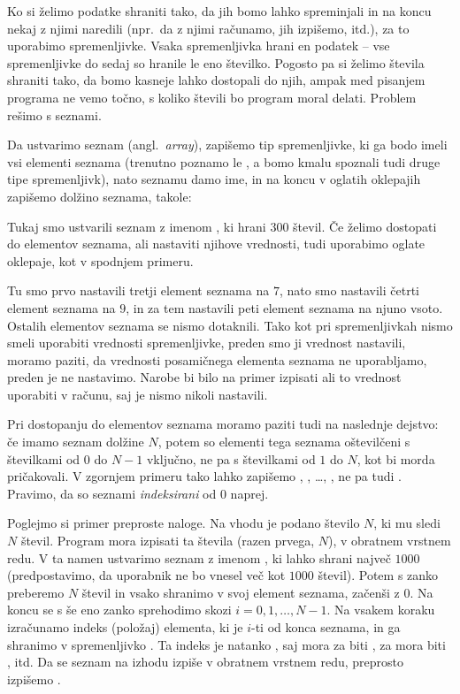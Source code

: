 
Ko si želimo podatke shraniti tako, da jih bomo lahko spreminjali in na koncu
nekaj z njimi naredili (npr.~da z njimi računamo, jih izpišemo, itd.), za to
uporabimo spremenljivke.
Vsaka spremenljivka hrani en podatek -- vse spremenljivke do sedaj so hranile le
eno številko.
Pogosto pa si želimo števila shraniti tako, da bomo kasneje lahko dostopali do
njih, ampak med pisanjem programa ne vemo točno, s koliko števili bo program
moral delati.
Problem rešimo s seznami.

Da ustvarimo seznam (angl.~\emph{array}), zapišemo tip spremenljivke, ki ga bodo
imeli vsi elementi seznama (trenutno poznamo le , a bomo kmalu
spoznali tudi druge tipe spremenljivk), nato seznamu damo ime, in na koncu v
oglatih oklepajih zapišemo dolžino seznama, takole:


Tukaj smo ustvarili seznam z imenom , ki hrani $300$ števil.
Če želimo dostopati do elementov seznama, ali nastaviti njihove vrednosti, tudi
uporabimo oglate oklepaje, kot v spodnjem primeru.


Tu smo prvo nastavili tretji element seznama na $7$, nato smo nastavili četrti
element seznama na $9$, in za tem nastavili peti element seznama na njuno vsoto.
Ostalih elementov seznama se nismo dotaknili.
Tako kot pri spremenljivkah nismo smeli uporabiti vrednosti spremenljivke,
preden smo ji vrednost nastavili, moramo paziti, da vrednosti posamičnega
elementa seznama ne uporabljamo, preden je ne nastavimo.
Narobe bi bilo na primer izpisati  ali to vrednost
uporabiti v računu, saj je nismo nikoli nastavili.

Pri dostopanju do elementov seznama moramo paziti tudi na naslednje dejstvo:
če imamo seznam dolžine $N$, potem so elementi tega seznama oštevilčeni s
številkami od $0$ do $N-1$ vključno, ne pa s številkami od $1$ do $N$, kot bi
morda pričakovali.
V zgornjem primeru tako lahko zapišemo ,
, \ldots, , ne pa tudi
.
Pravimo, da so seznami \emph{indeksirani} od $0$ naprej.

Poglejmo si primer preproste naloge.
Na vhodu je podano število $N$, ki mu sledi $N$ števil.
Program mora izpisati ta števila (razen prvega, $N$), v obratnem vrstnem redu.
V ta namen ustvarimo seznam z imenom , ki lahko shrani največ
$1000$ (predpostavimo, da uporabnik ne bo vnesel več kot $1000$ števil).
Potem s  zanko preberemo $N$ števil in vsako shranimo v svoj element
seznama, začenši z $0$.
Na koncu se s še eno  zanko sprehodimo skozi $i = 0, 1, \ldots, N-1$.
Na vsakem koraku izračunamo indeks (položaj) elementa, ki je $i$-ti od konca
seznama, in ga shranimo v spremenljivko .
Ta indeks je natanko , saj mora za  biti
, za  mora biti , itd.
Da se seznam na izhodu izpiše v obratnem vrstnem redu, preprosto izpišemo
.


